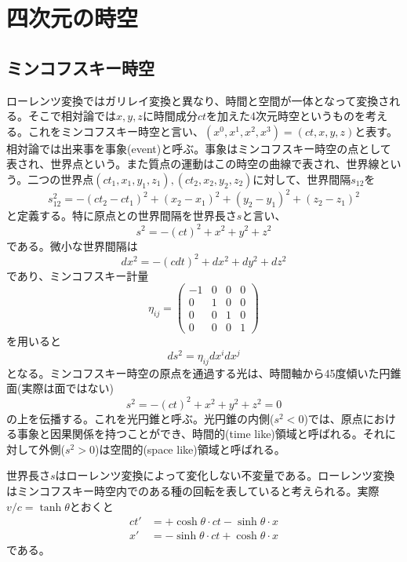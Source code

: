 \section{四次元の時空}

\subsection{ミンコフスキー時空}
    ローレンツ変換ではガリレイ変換と異なり、時間と空間が一体となって変換される。そこで相対論では$x, y, z$に時間成分$ct$を加えた4次元時空というものを考える。これをミンコフスキー時空と言い、$(x^0, x^1, x^2, x^3) = (ct, x, y, z)$と表す。相対論では出来事を事象(event)と呼ぶ。事象はミンコフスキー時空の点として表され、世界点という。また質点の運動はこの時空の曲線で表され、世界線という。二つの世界点$(ct_1, x_1, y_1, z_1), (ct_2, x_2, y_2, z_2)$に対して、世界間隔$s_{12}$を
        \[s_{12}^2 = -(ct_2 - ct_1)^2 + (x_2 - x_1)^2 + (y_2 - y_1)^2 + (z_2 - z_1)^2\]
    と定義する。特に原点との世界間隔を世界長さ$s$と言い、
        \[s^2 = -(ct)^2 + x^2 + y^2 + z^2\]
    である。微小な世界間隔は
        \[dx^2 = -(cdt)^2 + dx^2 + dy^2 + dz^2\]
    であり、ミンコフスキー計量
    \[
        \eta_{ij} =
        \begin{pmatrix}
            -1 & 0 & 0 & 0\\
            0 & 1 & 0 & 0\\
            0 & 0 & 1 & 0\\
            0 & 0 & 0 & 1
        \end{pmatrix}
    \]
    を用いると
        \[ds^2 = \eta_{ij}dx^idx^j\]
    となる。ミンコフスキー時空の原点を通過する光は、時間軸から45度傾いた円錐面(実際は面ではない)
        \[s^2 = -(ct)^2 + x^2 + y^2 + z^2 = 0\]
    の上を伝播する。これを光円錐と呼ぶ。光円錐の内側($s^2 < 0$)では、原点における事象と因果関係を持つことができ、時間的(time like)領域と呼ばれる。それに対して外側($s^2 > 0$)は空間的(space like)領域と呼ばれる。

    世界長さ$s$はローレンツ変換によって変化しない不変量である。ローレンツ変換はミンコフスキー時空内でのある種の回転を表していると考えられる。実際$v / c = \tanh\theta$とおくと
    \begin{align*}
        ct' &= +\cosh\theta \cdot ct - \sinh\theta \cdot x\\
        x'  &= -\sinh\theta \cdot ct + \cosh\theta \cdot x
    \end{align*}
    である。

